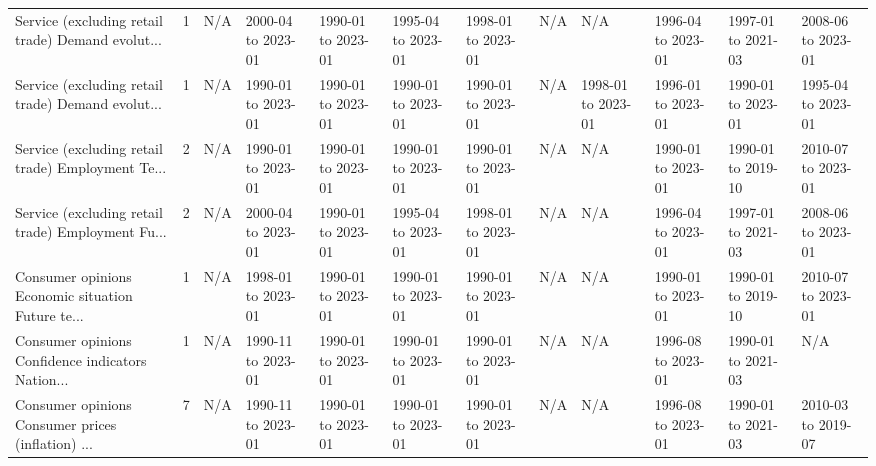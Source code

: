 \begin{table}
\begin{tabular}{@{}llYYYYYYYY@{}}
Service (excluding retail trade)  Demand evolut... &     1 &                N/A & 2000-04 to 2023-01 & 1990-01 to 2023-01 & 1995-04 to 2023-01 & 1998-01 to 2023-01 &                N/A &                N/A & 1996-04 to 2023-01 & 1997-01 to 2021-03 & 2008-06 to 2023-01 \\
Service (excluding retail trade)  Demand evolut... &     1 &                N/A & 1990-01 to 2023-01 & 1990-01 to 2023-01 & 1990-01 to 2023-01 & 1990-01 to 2023-01 &                N/A & 1998-01 to 2023-01 & 1996-01 to 2023-01 & 1990-01 to 2023-01 & 1995-04 to 2023-01 \\
Service (excluding retail trade)  Employment Te... &     2 &                N/A & 1990-01 to 2023-01 & 1990-01 to 2023-01 & 1990-01 to 2023-01 & 1990-01 to 2023-01 &                N/A &                N/A & 1990-01 to 2023-01 & 1990-01 to 2019-10 & 2010-07 to 2023-01 \\
Service (excluding retail trade)  Employment Fu... &     2 &                N/A & 2000-04 to 2023-01 & 1990-01 to 2023-01 & 1995-04 to 2023-01 & 1998-01 to 2023-01 &                N/A &                N/A & 1996-04 to 2023-01 & 1997-01 to 2021-03 & 2008-06 to 2023-01 \\
Consumer opinions  Economic situation Future te... &     1 &                N/A & 1998-01 to 2023-01 & 1990-01 to 2023-01 & 1990-01 to 2023-01 & 1990-01 to 2023-01 &                N/A &                N/A & 1990-01 to 2023-01 & 1990-01 to 2019-10 & 2010-07 to 2023-01 \\
Consumer opinions  Confidence indicators Nation... &     1 &                N/A & 1990-11 to 2023-01 & 1990-01 to 2023-01 & 1990-01 to 2023-01 & 1990-01 to 2023-01 &                N/A &                N/A & 1996-08 to 2023-01 & 1990-01 to 2021-03 &                N/A \\
Consumer opinions  Consumer prices (inflation) ... &     7 &                N/A & 1990-11 to 2023-01 & 1990-01 to 2023-01 & 1990-01 to 2023-01 & 1990-01 to 2023-01 &                N/A &                N/A & 1996-08 to 2023-01 & 1990-01 to 2021-03 & 2010-03 to 2019-07 \\
\bottomrule
\end{tabular}
\end{table}
